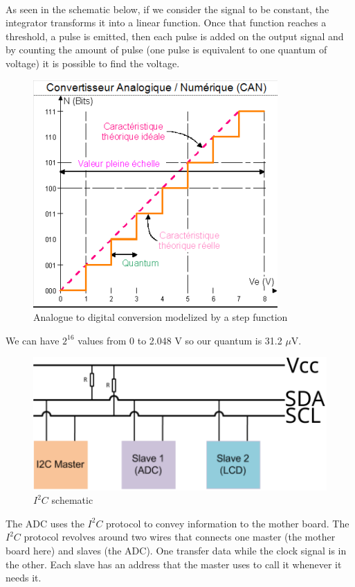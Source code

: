 \documentclass{article}[12pt]
\begin{document}
\paragraph{}
As seen in the schematic below, if we consider the signal to be constant, the integrator transforms it into a linear function.
Once that function reaches a threshold, a pulse is emitted, then each pulse is added on the output signal and by counting the amount of pulse (one pulse is equivalent to one quantum of voltage) it is possible to find the voltage.\\
\begin{figure}[H]
    \centering
    \includegraphics[width=.4\textwidth]{figures/CAN.png}
    \caption{Analogue to digital conversion modelized by a step function}
    \label{fig:CAN_step}
\end{figure}
We can have $2^{16}$ values from 0 to 2.048 V so our quantum is 31.2 $\mu$V.
\begin{figure}[H]
    \centering
    \includegraphics[width=\textwidth]{figures/i2c_diagram.pdf}
    \caption{$I^2C$ schematic}
    \label{fig:i2c_diagram}
\end{figure}
The ADC uses the $I^2C$ protocol to convey information to the mother board. 
The $I^2C$ protocol revolves around two wires that connects one master (the mother board here) and slaves (the ADC). 
One transfer data while the clock signal is in the other.
Each slave has an address that the master uses to call it whenever it needs it.
\end{document}
